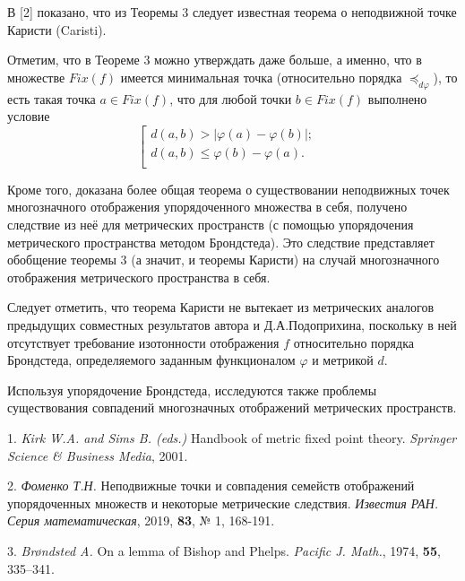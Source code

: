 В [2] показано, что  из Теоремы 3 следует известная теорема о неподвижной точке Каристи (Caristi).

Отметим, что в Теореме 3 можно утверждать даже больше, а именно, что в множестве $Fix(f)$ имеется минимальная точка (относительно порядка $\preceq_{d\varphi}$), то есть такая точка $a\in Fix(f)$, что для любой точки $b\in Fix(f)$ выполнено условие
$$
\left [\begin{array}{rl}d(a,b)>|\varphi(a)-\varphi(b)|;&
\\d(a,b)\le\varphi(b)-\varphi(a).\\
\end{array}
\right.
$$

Кроме того, доказана более общая теорема о существовании неподвижных точек многозначного отображения упорядоченного множества в себя, получено следствие из неё для  метрических пространств (с помощью упорядочения метрического пространства методом Брондстеда). Это следствие представляет обобщение теоремы 3 (а значит, и теоремы Каристи) на случай многозначного отображения метрического пространства в себя.

Следует отметить, что теорема Каристи не вытекает из метрических аналогов предыдущих совместных результатов автора и Д.А.Подоприхина, поскольку в ней отсутствует требование изотонности отображения $f$ относительно порядка Брондстеда, определяемого заданным функционалом $\varphi$ и метрикой $d$.

Используя упорядочение Брондстеда, исследуются также проблемы существования совпадений многозначных отображений метрических пространств.

\litlist

1. {\it Kirk W.A. and  Sims B. (eds.)} Handbook of metric fixed point theory. {\it Springer Science \& Business Media},  2001.

2. {\it Фоменко Т.Н.}  Неподвижные точки и совпадения семейств отображений упорядоченных множеств и некоторые метрические следствия. {\it Известия РАН. Серия математическая}, 2019, {\bf 83}, № 1, 168-191.

3. {\it  Br\o ndsted A.} On a lemma of Bishop and Phelps. {\it Pacific J. Math.}, 1974, {\bf 55}, 335--341.
